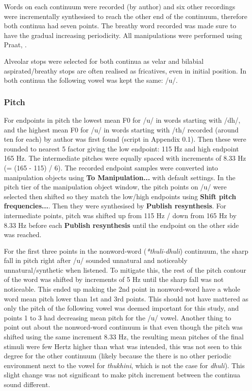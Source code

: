 \documentclass[12pt, english]{article}
\begin{document}
Words on each continuum were recorded (by author) and six other recordings were incrementally synthesised to reach the other end of the continuum, therefore both continua had seven points. The breathy word recorded was made sure to have the gradual increasing periodicity. All manipulations were performed using Praat, \cite{boersma2001praat}. \\ \par

Alveolar stops were selected for both continua as velar and bilabial aspirated/breathy stops are often realised as fricatives, even in initial position. In both continua the following vowel was kept the same: /u/.

\subsubsection*{Pitch}
    For endpoints in pitch the lowest mean F0 for /u/ in words starting with /dh/, and the highest mean F0 for /u/ in words starting with /th/ recorded (around ten for each) by author was first found (script in Appendix 0.1). Then these were rounded to nearest 5 factor giving the low endpoint: 115 Hz and high endpoint 165 Hz. The intermediate pitches were equally spaced with increments of 8.33 Hz (= (165 - 115) / 6). The recorded endpoint samples were converted into manipulation objects using \textbf{To Manipulation...} with default settings. In the pitch tier of the manipulation object window, the pitch points on /u/ were selected then shifted so they match the low/high endpoints using \textbf{Shift pitch frequencies...}. Then they were synthesised by \textbf{Publish resynthesis}. For intermediate points, pitch was shifted up from 115 Hz / down from 165 Hz by 8.33 Hz before each \textbf{Publish resynthesis} until the endpoint on the other side was reached. \\ \par
    
    For the first three points in the nonword-word (\textit{*thuli-dhuli}) continuum, the sharp fall in pitch right after /u/ sounded unnatural and noticeably unnatural/synthetic when listened. To mitigate this, the rest of the pitch contour of the word was shifted by increments of 5 Hz until the sharp fall was not noticeable. This ended up making the 2nd point in nonword-word have a whole word mean pitch lower than 1st and 3rd points. This should not have mattered as only the pitch of the following vowel was deemed important for this study, and points 1 to 3 had decreasing mean pitch for the /u/ vowel. Another thing to point out about the nonword-word continuum is that even though the pitch was shifted using the same increment 8.33 Hz, the resulting mean pitches of the final stimuli were few Hertz higher than what was intended, this was not seen to this degree for the other continuum (likely because the there is no other periodic environment next to the vowel for \textit{thukhini}, which is not the case for \textit{dhuli}). This slight change was not significant to make pitch increment between the continua sound different. 
    
\end{document}
